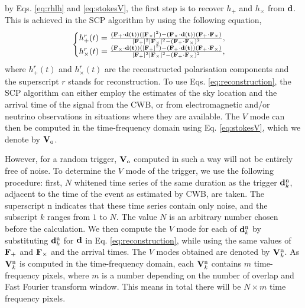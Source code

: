 \documentclass[aps,twocolumn,showpacs,groupedaddress, nofootinbib]{revtex4}  %
\begin{document}
by Eqs. \ref{eq:rhlh} and \ref{eq:stokesV},
the first step is to recover $h_+$ and $h_\times$ from $\bold{d}$.
This is achieved in the \ac{SCP} algorithm by using the following equation,
\begin{equation}\label{eq:reconstruction}
\begin{cases} 
h^{r}_+(t) = \frac{(\bold{F}_+\cdot \bold{d}(\bold{t}))(\lvert\bold{F}_{\times}\rvert^{2}) - 
(\bold{F}_{\times}\cdot \bold{d}(\bold{t}))(\bold{F}_{+} \cdot \bold{F}_{\times})}
{\lvert\bold{F}_{+}\rvert^{2}\lvert\bold{F}_{\times}\rvert^{2} - (\bold{F}_{+} \cdot \bold{F}_{\times})^2},\\ 
h^{r}_\times(t) = \frac{(\bold{F}_{\times}\cdot \bold{d}(\bold{t}))(\lvert\bold{F}_{+}\rvert^{2}) - 
(\bold{F}_{+}\cdot \bold{d}(\bold{t}))(\bold{F}_{+} \cdot \bold{F}_{\times})}
{\lvert\bold{F}_{+}\rvert^{2}\lvert\bold{F}_{\times}\rvert^{2} - (\bold{F}_{+} \cdot \bold{F}_{\times})^2},\\
\end{cases} 
\end{equation}
where $h^{r}_+(t)$ and $h^{r}_\times(t) $ are the reconstructed polarisation components and the superscript $r$ stands for reconstruction. 
To use Eqs. \ref{eq:reconstruction}, the \ac{SCP} algorithm can either employ the estimates of the sky location and the arrival time of the signal from the \ac{CWB},
or from electromagnetic and/or neutrino observations in situations where they are available.  
The $V$ mode can then be computed in the time-frequency domain using Eq. \ref{eq:stokesV}, which we denote by $\bold{V}_\text{o}$.

However, for a random trigger, $\bold{V}_\text{o}$ computed in such a way will not be entirely free of noise.
To determine the $V$ mode of the trigger, we use the following procedure:
first, $N$ whitened time series of the same duration as the trigger $\bold{d}^{\text{n}}_{k}$, adjacent to the time of the event as estimated by \ac{CWB}, are taken.
The superscript $\text{n}$ indicates that these time series contain only noise, and the subscript $k$ ranges from $1$ to $N$.
The value $N$ is an arbitrary number chosen before the calculation.
We then compute the $V$ mode for each of $\bold{d}^{\text{n}}_{k}$ by substituting $\bold{d}^{\text{n}}_{k}$ for $\bold{d}$ in Eq. \ref{eq:reconstruction}, 
while using the same values of $\bold{F}_+$ and $\bold{F}_{\times}$
and the arrival times.
The $V$ modes obtained are denoted by $\bold{V}_{k}^{\text{n}}$.
As $\bold{V}_{k}^{\text{n}}$ is computed in the time-frequency domain, each $\bold{V}_{k}^{\text{n}}$ contains $m$ time-frequency pixels, 
where $m$ is a number depending on the number of overlap and Fast Fourier transform window.
This means in total there will be $N\times m$ time frequency pixels.
\end{document}

